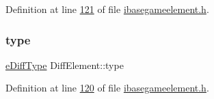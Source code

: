 Definition at line \hyperlink{a00047_source_l00121}{121} of file \hyperlink{a00047_source}{ibasegameelement.\+h}.

\mbox{\label{a00141_ad5d4aeee742d315da4f48e7f0b0218db}} 
\subsubsection{\texorpdfstring{type}{type}}
{\footnotesize\ttfamily \hyperlink{a00047_ab32e61d383765a32bc5f9efebb4b9f55}{e\+Diff\+Type} Diff\+Element\+::type}



Definition at line \hyperlink{a00047_source_l00120}{120} of file \hyperlink{a00047_source}{ibasegameelement.\+h}.

